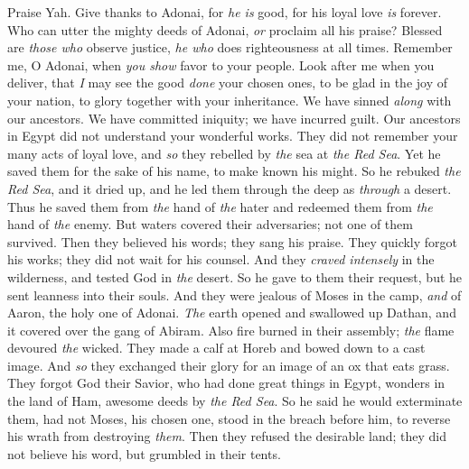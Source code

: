 \begin{biblechapter} %
 Praise Yah. Give thanks to Adonai, for \textit{he is} good, 
for his loyal love \textit{is} forever.
\verse Who can utter the mighty deeds of Adonai, 
\textit{or} proclaim all his praise?
\verse Blessed are \textit{those who} observe justice, 
\textit{he who} does righteousness at all times.
\verse Remember me, O Adonai, when \textit{you show} favor to your people. 
Look after me when you deliver,
\verse that \textit{I} may see the good \textit{done} your chosen ones, 
to be glad in the joy of your nation, 
to glory together with your inheritance.
\verse We have sinned \textit{along} with our ancestors. 
We have committed iniquity; we have incurred guilt.
\verse Our ancestors in Egypt did not understand your wonderful works. 
They did not remember your many acts of loyal love, 
and \textit{so} they rebelled by \textit{the} sea at \textit{the Red Sea}.
\verse Yet he saved them for the sake of his name, 
to make known his might.
\verse So he rebuked \textit{the Red Sea}, and it dried up, 
and he led them through the deep as \textit{through} a desert.
\verse Thus he saved them from \textit{the} hand of \textit{the} hater 
and redeemed them from \textit{the} hand of \textit{the} enemy.
\verse But waters covered their adversaries; 
not one of them survived.
\verse Then they believed his words; 
they sang his praise.
\verse They quickly forgot his works; 
they did not wait for his counsel.
\verse And they \textit{craved intensely} in the wilderness, 
and tested God in \textit{the} desert.
\verse So he gave to them their request, 
but he sent leanness into their souls.
\verse And they were jealous of Moses in the camp, 
\textit{and} of Aaron, the holy one of Adonai.
\verse \textit{The} earth opened and swallowed up Dathan, 
and it covered over the gang of Abiram.
\verse Also fire burned in their assembly; 
\textit{the} flame devoured \textit{the} wicked.
\verse They made a calf at Horeb 
and bowed down to a cast image.
\verse And \textit{so} they exchanged their glory 
for an image of an ox that eats grass.
\verse They forgot God their Savior, 
who had done great things in Egypt,
\verse wonders in the land of Ham, 
awesome deeds by \textit{the Red Sea}.
\verse So he said he would exterminate them, 
had not Moses, his chosen one, 
stood in the breach before him, 
to reverse his wrath from destroying \textit{them}.
\verse Then they refused the desirable land; 
they did not believe his word,
\verse but grumbled in their tents. 

\end{biblechapter}
